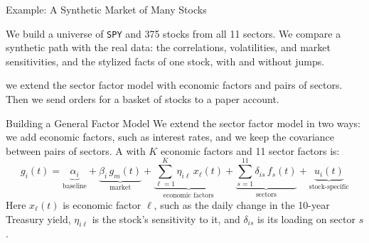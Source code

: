 \documentclass[aspectratio=169,11pt]{beamer}
\newcommand{\repo}{https://github.com/varnerlab/CHEME-5660-CourseRepository-Fall-2026/blob/main/lectures/week-14/L14a}
\begin{document}
\begin{frame}{Example: A Synthetic Market of Many Stocks}
  \vspace{0.3em}
  {\normalsize\textbf{}\par\small
  \href{\repo/CHEME-5660-L14a-Example-JumpHMM-SectorFactor-Fall-2026.ipynb}{}}

  \vspace{0.8em}
  We build a universe of \texttt{SPY} and 375 stocks from all 11 sectors. We compare a synthetic
  path with the real data: the correlations, volatilities, and market sensitivities, and the
  stylized facts of one stock, with and without jumps.

  \vspace{0.8em}
  \textbf{} we extend the sector factor model with economic factors and pairs of
  sectors. Then we send orders for a basket of stocks to a paper account.
\end{frame}

\begin{frame}{Building a General Factor Model}
  We extend the sector factor model in two ways: we add economic factors, such as interest rates,
  and we keep the covariance between pairs of sectors. A  with $K$
  economic factors and 11 sector factors is:
  \begin{equation*}
    g_{i}(t)=\underbrace{\alpha_{i}}_{\textstyle\text{baseline}}+\underbrace{\beta_{i}\,g_{m}(t)}_{\textstyle\text{market}}+\underbrace{\sum_{\ell=1}^{K}\eta_{i\ell}\,x_{\ell}(t)}_{\textstyle\text{economic factors}}+\underbrace{\sum_{s=1}^{11}\delta_{is}\,f_{s}(t)}_{\textstyle\text{sectors}}+\underbrace{u_{i}(t)}_{\textstyle\text{stock-specific}}
  \end{equation*}
  Here $x_{\ell}(t)$ is economic factor $\ell$, such as the daily change in the 10-year Treasury
  yield, $\eta_{i\ell}$ is the stock's sensitivity to it, and $\delta_{is}$ is its loading on
  sector $s$.
\end{frame}
\end{document}
